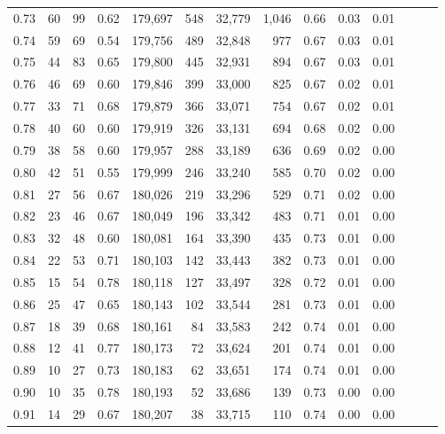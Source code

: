 \begin{tabular}{rrrrrrrrrrrrrr}
0.73 &      60 &   99 &  0.62 &  179,697 &      548 &  32,779 &   1,046 &  0.66 &  0.03 &      0.01 \\
0.74 &      59 &   69 &  0.54 &  179,756 &      489 &  32,848 &     977 &  0.67 &  0.03 &      0.01 \\
0.75 &      44 &   83 &  0.65 &  179,800 &      445 &  32,931 &     894 &  0.67 &  0.03 &      0.01 \\
0.76 &      46 &   69 &  0.60 &  179,846 &      399 &  33,000 &     825 &  0.67 &  0.02 &      0.01 \\
0.77 &      33 &   71 &  0.68 &  179,879 &      366 &  33,071 &     754 &  0.67 &  0.02 &      0.01 \\
0.78 &      40 &   60 &  0.60 &  179,919 &      326 &  33,131 &     694 &  0.68 &  0.02 &      0.00 \\
0.79 &      38 &   58 &  0.60 &  179,957 &      288 &  33,189 &     636 &  0.69 &  0.02 &      0.00 \\
0.80 &      42 &   51 &  0.55 &  179,999 &      246 &  33,240 &     585 &  0.70 &  0.02 &      0.00 \\
0.81 &      27 &   56 &  0.67 &  180,026 &      219 &  33,296 &     529 &  0.71 &  0.02 &      0.00 \\
0.82 &      23 &   46 &  0.67 &  180,049 &      196 &  33,342 &     483 &  0.71 &  0.01 &      0.00 \\
0.83 &      32 &   48 &  0.60 &  180,081 &      164 &  33,390 &     435 &  0.73 &  0.01 &      0.00 \\
0.84 &      22 &   53 &  0.71 &  180,103 &      142 &  33,443 &     382 &  0.73 &  0.01 &      0.00 \\
0.85 &      15 &   54 &  0.78 &  180,118 &      127 &  33,497 &     328 &  0.72 &  0.01 &      0.00 \\
0.86 &      25 &   47 &  0.65 &  180,143 &      102 &  33,544 &     281 &  0.73 &  0.01 &      0.00 \\
0.87 &      18 &   39 &  0.68 &  180,161 &       84 &  33,583 &     242 &  0.74 &  0.01 &      0.00 \\
0.88 &      12 &   41 &  0.77 &  180,173 &       72 &  33,624 &     201 &  0.74 &  0.01 &      0.00 \\
0.89 &      10 &   27 &  0.73 &  180,183 &       62 &  33,651 &     174 &  0.74 &  0.01 &      0.00 \\
0.90 &      10 &   35 &  0.78 &  180,193 &       52 &  33,686 &     139 &  0.73 &  0.00 &      0.00 \\
0.91 &      14 &   29 &  0.67 &  180,207 &       38 &  33,715 &     110 &  0.74 &  0.00 &      0.00 \\

\end{tabular}
